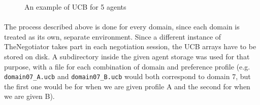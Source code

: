 \documentclass[12pt]{article}
\numberwithin{equation}{section}
\begin{document}
				\begin{figure}[H]
					\centering
					\captionsetup{justification=centering}
					\caption{An example of UCB for 5 agents}
					\label{fig:UCB_example}
				\end{figure}
	
			\paragraph*{}
				The process described above is done for every domain, since each domain is treated as its own, separate environment. Since a different instance of TheNegotiator takes part in each negotiation session, the UCB arrays have to be stored on disk. A subdirectory inside the given agent storage was used for that purpose, with a file for each combination of domain and preference profile (e.g. \texttt{domain07\_A.ucb} and  \texttt{domain07\_B.ucb} would both correspond to domain 7, but the first one would be for when we are given profile A and the second for when we are given B).
\end{document}

